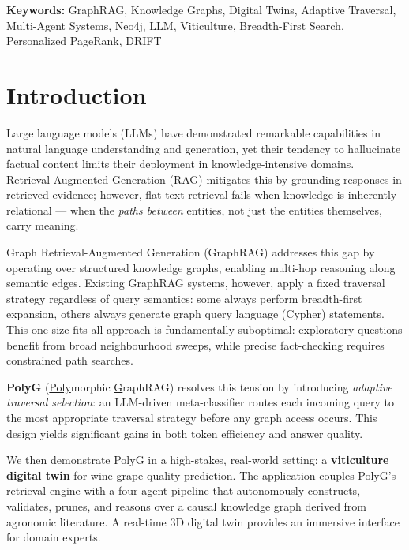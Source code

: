\documentclass[12pt,a4paper]{article}
\begin{document}
{\small\textbf{Keywords:} GraphRAG, Knowledge Graphs, Digital Twins,
Adaptive Traversal, Multi-Agent Systems, Neo4j, LLM, Viticulture,
Breadth-First Search, Personalized PageRank, DRIFT}

\tableofcontents
\newpage

\section{Introduction}

Large language models (LLMs) have demonstrated remarkable capabilities in
natural language understanding and generation, yet their tendency to hallucinate
factual content limits their deployment in knowledge-intensive domains.
Retrieval-Augmented Generation (RAG) mitigates this by grounding responses in
retrieved evidence; however, flat-text retrieval fails when knowledge is
inherently relational — when the \emph{paths between} entities, not just the
entities themselves, carry meaning.

Graph Retrieval-Augmented Generation (GraphRAG) addresses this gap by operating
over structured knowledge graphs, enabling multi-hop reasoning along semantic
edges. Existing GraphRAG systems, however, apply a fixed traversal strategy
regardless of query semantics: some always perform breadth-first expansion,
others always generate graph query language (Cypher) statements. This
one-size-fits-all approach is fundamentally suboptimal: exploratory questions
benefit from broad neighbourhood sweeps, while precise fact-checking requires
constrained path searches.

\textbf{PolyG} (\underline{Poly}morphic \underline{G}raphRAG) resolves this
tension by introducing \emph{adaptive traversal selection}: an LLM-driven
meta-classifier routes each incoming query to the most appropriate traversal
strategy before any graph access occurs. This design yields significant gains
in both token efficiency and answer quality.

We then demonstrate PolyG in a high-stakes, real-world setting:
a \textbf{viticulture digital twin} for wine grape quality prediction. The
application couples PolyG's retrieval engine with a four-agent pipeline that
autonomously constructs, validates, prunes, and reasons over a causal
knowledge graph derived from agronomic literature. A real-time 3D digital twin
provides an immersive interface for domain experts.
\end{document}
